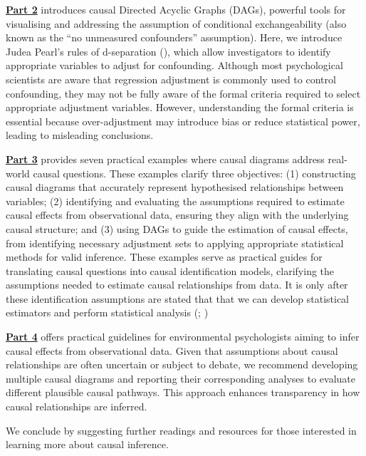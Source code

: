 \documentclass[
  singlecolumn]{article}
\begin{document}
\hyperref[section-part2]{\textbf{Part 2}} introduces causal Directed
Acyclic Graphs (DAGs), powerful tools for visualising and addressing the
assumption of conditional exchangeability (also known as the ``no
unmeasured confounders'' assumption). Here, we introduce Judea Pearl's
rules of d-separation (), which
allow investigators to identify appropriate variables to adjust for
confounding. Although most psychological scientists are aware that
regression adjustment is commonly used to control confounding, they may
not be fully aware of the formal criteria required to select appropriate
adjustment variables. However, understanding the formal criteria is
essential because over-adjustment may introduce bias or reduce
statistical power, leading to misleading conclusions.

\hyperref[section-part3]{\textbf{Part 3}} provides seven practical
examples where causal diagrams address real-world causal questions.
These examples clarify three objectives: (1) constructing causal
diagrams that accurately represent hypothesised relationships between
variables; (2) identifying and evaluating the assumptions required to
estimate causal effects from observational data, ensuring they align
with the underlying causal structure; and (3) using DAGs to guide the
estimation of causal effects, from identifying necessary adjustment sets
to applying appropriate statistical methods for valid inference. These
examples serve as practical guides for translating causal questions into
causal identification models, clarifying the assumptions needed to
estimate causal relationships from data. It is only after these
identification assumptions are stated that that we can develop
statistical estimators and perform statistical analysis
(;
)

\hyperref[section-part4]{\textbf{Part 4}} offers practical guidelines
for environmental psychologists aiming to infer causal effects from
observational data. Given that assumptions about causal relationships
are often uncertain or subject to debate, we recommend developing
multiple causal diagrams and reporting their corresponding analyses to
evaluate different plausible causal pathways. This approach enhances
transparency in how causal relationships are inferred.

We conclude by suggesting further readings and resources for those
interested in learning more about causal inference.
\end{document}

